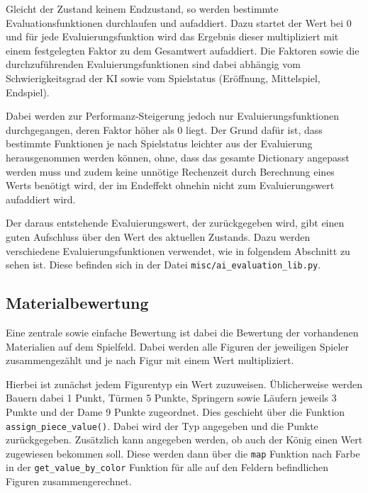 Gleicht der Zustand keinem Endzustand, so werden bestimmte
Evaluationsfunktionen durchlaufen und aufaddiert. Dazu startet der Wert
bei 0 und für jede Evaluierungsfunktion wird das Ergebnis dieser
multipliziert mit einem festgelegten Faktor zu dem Gesamtwert
aufaddiert. Die Faktoren sowie die durchzuführenden
Evaluierungsfunktionen sind dabei abhängig vom Schwierigkeitsgrad der KI
sowie vom Spielstatus (Eröffnung, Mittelspiel, Endspiel).

Dabei werden zur Performanz-Steigerung jedoch nur Evaluierungsfunktionen
durchgegangen, deren Faktor höher als 0 liegt. Der Grund dafür ist,
dass bestimmte Funktionen je nach Spielstatus leichter aus der
Evaluierung herausgenommen werden können, ohne, dass das gesamte
Dictionary angepasst werden muss und zudem keine unnötige Rechenzeit
durch Berechnung eines Werts benötigt wird, der im Endeffekt ohnehin
nicht zum Evaluierungswert aufaddiert wird.

Der daraus entstehende Evaluierungswert, der zurückgegeben wird, gibt
einen guten Aufschluss über den Wert des aktuellen Zustands. Dazu werden
verschiedene Evaluierungsfunktionen verwendet, wie in folgendem
Abschnitt zu sehen ist. Diese befinden sich in der Datei
\texttt{misc/ai\_evaluation\_lib.py}.

    \subsection{Materialbewertung}\label{materialbewertung}

Eine zentrale sowie einfache Bewertung ist dabei die Bewertung der
vorhandenen Materialien auf dem Spielfeld. Dabei werden alle Figuren der
jeweiligen Spieler zusammengezählt und je nach Figur mit einem Wert
multipliziert.

Hierbei ist zunächst jedem Figurentyp ein Wert zuzuweisen. Üblicherweise
werden Bauern dabei 1 Punkt, Türmen 5 Punkte, Springern sowie Läufern
jeweils 3 Punkte und der Dame 9 Punkte zugeordnet. Dies geschieht über
die Funktion \texttt{assign\_piece\_value()}. Dabei wird der Typ
angegeben und die Punkte zurückgegeben. Zusätzlich kann angegeben
werden, ob auch der König einen Wert zugewiesen bekommen soll. Diese
werden dann über die \texttt{map} Funktion nach Farbe in der
\texttt{get\_value\_by\_color} Funktion für alle auf den Feldern
befindlichen Figuren zusammengerechnet.

